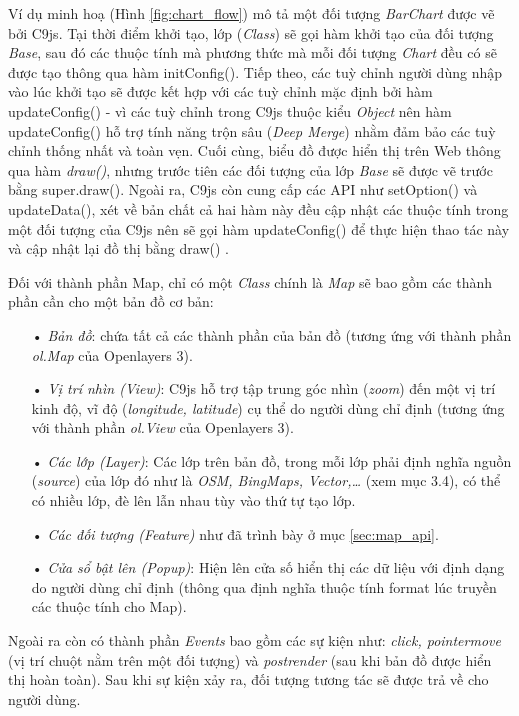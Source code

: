 \documentclass[12pt,a4paper,twoside]{article}
\begin{document}
Ví dụ minh hoạ (Hình \ref{fig:chart_flow}) mô tả một đối tượng \textit{BarChart} được vẽ bởi C9js. Tại thời điểm khởi tạo, lớp (\textit{Class}) sẽ gọi hàm khởi tạo của đối tượng \textit{Base}, sau đó các thuộc tính mà phương thức mà mỗi đối tượng \textit{Chart} đều có sẽ được tạo thông qua hàm \textsf{initConfig()}. Tiếp theo, các tuỳ chỉnh người dùng nhập vào lúc khởi tạo sẽ được kết hợp với các tuỳ chỉnh mặc định bởi hàm \textsf{updateConfig()} - vì các tuỳ chỉnh trong C9js thuộc kiểu \textit{Object} nên hàm \textsf{updateConfig()} hỗ trợ tính năng trộn sâu (\textit{Deep Merge})\cite{merge_deep} nhằm đảm bảo các tuỳ chỉnh thống nhất và toàn vẹn. Cuối cùng, biểu đồ được hiển thị trên Web thông qua hàm \textit{draw()}, nhưng trước tiên các đối tượng của lớp \textit{Base} sẽ được vẽ trước bằng \textsf{super.draw()}. Ngoài ra, C9js còn cung cấp các API như \textsf{setOption()} và \textsf{updateData()}, xét về bản chất cả hai hàm này đều cập nhật các thuộc tính trong một đối tượng của C9js nên sẽ gọi hàm \textsf{updateConfig()} để thực hiện thao tác này và cập nhật lại đồ thị bằng \textsf{draw()} .

Đối với thành phần Map, chỉ có một \textit{Class} chính là \textit{Map} sẽ bao gồm các thành phần cần cho một bản đồ cơ bản:
\begin{itemize}
\item[•] \emph{Bản đồ}: chứa tất cả các thành phần của bản đồ (tương ứng với thành phần \textit{ol.Map} của Openlayers 3).
\item[•] \emph{Vị trí nhìn (View)}: C9js hỗ trợ tập trung góc nhìn (\textit{zoom}) đến một vị trí kinh độ, vĩ độ (\textit{longitude, latitude}) cụ thể do người dùng chỉ định (tương ứng với thành phần \textit{ol.View} của Openlayers 3).
\item[•] \emph{Các lớp (Layer)}: Các lớp trên bản đồ, trong mỗi lớp phải định nghĩa nguồn (\textit{source}) của lớp đó như là \textit{OSM, BingMaps, Vector,…} (xem mục 3.4), có thể có nhiều lớp, đè lên lẫn nhau tùy vào thứ tự tạo lớp.
\item[•] \emph{Các đối tượng (Feature)} như đã trình bày ở mục \ref{sec:map_api}.
\item[•] \emph{Cửa sổ bật lên (Popup)}: Hiện lên cửa số hiển thị các dữ liệu với định dạng do người dùng chỉ định (thông qua định nghĩa thuộc tính format lúc truyền các thuộc tính cho Map).
\end{itemize}

Ngoài ra còn có thành phần \textit{Events} bao gồm các sự kiện như: \textit{click, pointermove} (vị trí chuột nằm trên một đối tượng) và \textit{postrender} (sau khi bản đồ được hiển thị hoàn toàn). Sau khi sự kiện xảy ra, đối tượng tương tác sẽ được trả về cho người dùng.
\end{document}

